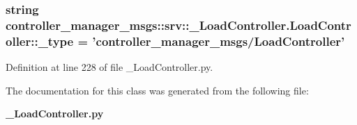 \subsubsection[{\-\_\-type}]{\setlength{\rightskip}{0pt plus 5cm}string {\bf controller\-\_\-manager\-\_\-msgs\-::srv\-::\-\_\-\-Load\-Controller.\-Load\-Controller\-::\-\_\-type} = 'controller\-\_\-manager\-\_\-msgs/{\bf \-Load\-Controller}'\hspace{0.3cm}{\ttfamily  [static, private]}}\label{classcontroller__manager__msgs_1_1srv_1_1__LoadController_1_1LoadController_a0e87bdaa8d48032a95f8cf69e3923a2c}


\-Definition at line 228 of file \-\_\-\-Load\-Controller.\-py.



\-The documentation for this class was generated from the following file\-:\begin{DoxyCompactItemize}
\item 
{\bf \-\_\-\-Load\-Controller.\-py}\end{DoxyCompactItemize}
